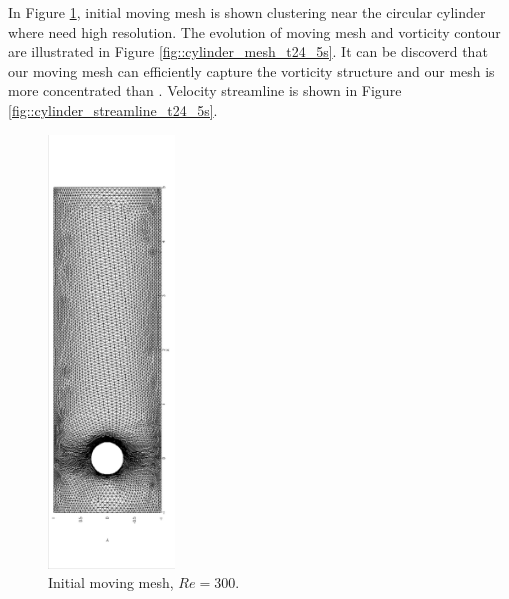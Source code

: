 \documentclass[mathpazo]{aamm}
\begin{document}
      In Figure \ref{fig::cylinder_initial_mesh}, initial moving mesh
      is shown clustering near the circular cylinder where need high
      resolution. The evolution of
      moving mesh and vorticity contour are illustrated in Figure
      \ref{fig::cylinder_mesh_t24_5s}. It can be discoverd that our
      moving mesh can efficiently capture the vorticity structure and
      our mesh is more concentrated than \cite{cao1999anr}. Velocity
      streamline is shown in Figure
      \ref{fig::cylinder_streamline_t24_5s}.

      
      
      \begin{figure}[!htbp]
        \centering
        \includegraphics[width = 0.3\textwidth, angle = -90]{picture/obstacle_flow_data/initial_mesh.eps}
        \caption{\small Initial moving mesh, $Re = 300$.}
        \label{fig::cylinder_initial_mesh}
      \end{figure}
\end{document}
